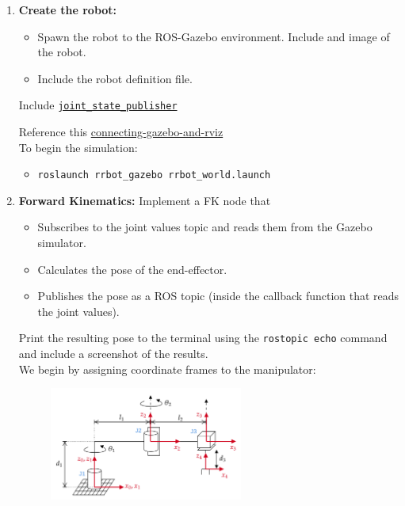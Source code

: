 \documentclass[10pt]{article}
\begin{document}
\setlength{\abovedisplayskip}{6pt}
\setlength{\belowdisplayskip}{3pt}
\setlength{\abovedisplayshortskip}{4pt}
\setlength{\belowdisplayshortskip}{4pt}

\begin{enumerate}
	\item \textbf{Create the robot:}
	
	\begin{itemize}
		\item Spawn the robot to the ROS-Gazebo environment. Include and image of the robot.
		
		\item Include the robot definition file.
		\\
	\end{itemize}

	Include \href{http://wiki.ros.org/joint_state_publisher}{\texttt{joint\_state\_publisher}}
	
	Reference this \href{https://answers.ros.org/question/348008/connecting-gazebo-and-rviz/}{connecting-gazebo-and-rviz}
	\\
	
	To begin the simulation:
	\begin{itemize}
		\item \texttt{roslaunch rrbot\_gazebo rrbot\_world.launch}
	\end{itemize}	
	
	\item \textbf{Forward Kinematics:}
	Implement a FK node that
	
	\begin{itemize}	
		\item Subscribes to the joint values topic and reads them from the Gazebo simulator.
		\item Calculates the pose of the end-effector.
		\item Publishes the pose as a ROS topic (inside the callback function that reads the joint values).
	\end{itemize}
	Print the resulting pose to the terminal using the \texttt{rostopic echo} command and include a screenshot of the results.
	\\
	
	We begin by assigning coordinate frames to the manipulator:
	
	\begin{figure}[h]
		\centering
		\includegraphics[width=0.6\textwidth]{figures/rrp_manipulator_reference_frames.png}
	\end{figure}
	

\end{enumerate}
\end{document}
